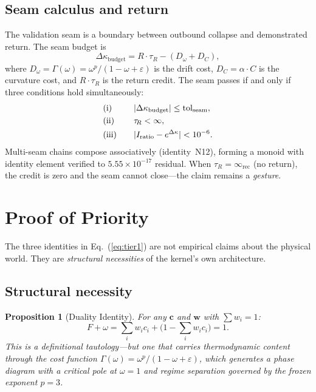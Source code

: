 \documentclass[
  aps,
  prd,
  twocolumn,
  superscriptaddress,
  nofootinbib,
  floatfix
]{revtex4-2}
\newtheorem{proposition}[theorem]{Proposition}
\newcommand{\tR}{\tau_{\!R}}
\newcommand{\Gam}{\Gamma}
\newcommand{\eps}{\varepsilon}
\newcommand{\IR}{\infty_{\mathrm{rec}}}
\newcommand{\tolseam}{\mathrm{tol}_{\mathrm{seam}}}
\newcommand{\beq}{\begin{equation}}
\newcommand{\eeq}{\end{equation}}
\newcommand{\tvec}{\mathbf{c}}
\newcommand{\wvec}{\mathbf{w}}
\begin{document}
\subsection{Seam calculus and return}

The validation seam is a boundary between outbound collapse and
demonstrated return.  The seam budget is
\beq\label{eq:seam}
  \Delta\kappa_{\mathrm{budget}} = R\cdot\tR - (D_\omega + D_C),
\eeq
where $D_\omega = \Gam(\omega) = \omega^p/(1 - \omega + \eps)$ is
the drift cost, $D_C = \alpha \cdot C$ is the curvature cost, and
$R\cdot\tR$ is the return credit.  The seam passes if and only if
three conditions hold simultaneously:
\begin{alignat}{2}
  &\text{(i)}  &\quad& |\Delta\kappa_{\mathrm{budget}}| \leq \tolseam, \notag\\
  &\text{(ii)} && \tR < \infty, \label{eq:seam-pass}\\
  &\text{(iii)}&& |I_{\mathrm{ratio}} - e^{\Delta\kappa}| < 10^{-6}. \notag
\end{alignat}
Multi-seam chains compose associatively (identity~N12), forming a
monoid with identity element verified to $5.55 \times 10^{-17}$
residual.  When $\tR = \IR$ (no return), the credit is zero and the
seam cannot close---the claim remains a \emph{gesture}.

\section{Proof of Priority}\label{sec:priority}

The three identities in Eq.~(\ref{eq:tier1}) are not empirical claims
about the physical world.  They are \emph{structural necessities} of
the kernel's own architecture.

\subsection{Structural necessity}

\begin{proposition}[Duality Identity]\label{prop:duality}
For any $\tvec$ and $\wvec$ with $\sum w_i = 1$:
\beq\label{eq:duality-proof}
  F + \omega = \textstyle\sum_i w_i c_i + \bigl(1 - \sum_i w_i c_i\bigr) = 1.
\eeq
This is a definitional tautology---but one that carries thermodynamic
content through the cost function
$\Gam(\omega) = \omega^p/(1 - \omega + \eps)$, which generates a
phase diagram with a critical pole at $\omega = 1$ and regime
separation governed by the frozen exponent $p = 3$.
\end{proposition}
\end{document}
